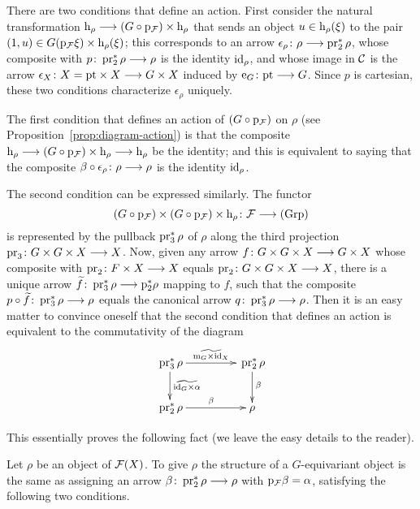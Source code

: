 \begin{3   FIBERED CATEGORIES}
\begin{3.8 Equivariant objects in fibcats}
There are two conditions that define an action. First consider the natural transformation $\h_{\rho} \arr (G \circ \p_{\cF}) \times \h_{\rho}$ that sends an object $u \in  \mathrm{h}_{\rho}(\xi)$ to the pair $(1, u) \in G(\mathrm{p}_{\mathcal{F}}\xi) \times \mathrm{h}_{\rho}(\xi)$; this corresponds to an arrow $\epsilon_{\rho} \colon \rho \arr \pr_{2}^{*}\rho$, whose composite with $p \colon  \pr_{2}^{*}\rho \arr \rho$ is the identity $\mathrm{id}_{\rho}$, and whose image in $\mathcal{C}$ is the arrow $\epsilon_{X}\colon X = \pt \times X \arr G \times X$ induced by $\iden_{G} \colon \pt \arr G$. Since $p$ is cartesian, these two conditions characterize $\epsilon_{\rho}$ uniquely.

The first condition that defines an action of $(G \circ \mathrm{p}_{\mathcal{F}})$ on $\rho$ (see Proposition~\ref{prop:diagram-action}) is that the composite $\h_{\rho} \arr (G \circ \p_{\cF}) \times \h_{\rho} \arr \h_{\rho}$ be the identity; and this is equivalent to saying that the composite $\beta \circ \epsilon_{\rho} \colon \rho \arr \rho$ is the identity $\mathrm{id}_{\rho}$.

The second condition can be expressed similarly. The functor
   \[
   (G \circ \p_{\cF}) \times (G \circ \p_{\cF}) \times \h_{\rho} \colon \cF 
   \arr \catgrp
   \]
is represented by the pullback $\operatorname{pr}_{3}^{*}\rho$ of $\rho$ along the third projection $\pr_{3} \colon G \times G \times X \arr X$. Now, given any arrow $f \colon G \times G \times X \arr G \times X$ whose composite with $\pr_{2}\colon F \times X \arr X$ equals $\pr_{2}\colon G \times G \times X \arr X$, there is a unique arrow $\widetilde{f} \colon \pr_{3}^{*}\rho \arr \p_{2}^{*}\rho$ mapping to $f$, such that the composite $p \circ \widetilde{f} \colon  \pr_{3}^{*}\rho \arr \rho$ equals the canonical arrow $q \colon \pr_{3}^{*}\rho \arr \rho$. Then it is an easy matter to convince oneself that the second condition that defines an action is equivalent to the commutativity of the diagram
   \begin{equation}\label{eq:lifts}
   \xymatrix@C+20pt{
   {}\pr_{3}^{*}\rho \ar[r]^{\widetilde{\mul_{G}\times \id_{X}}}
      \ar[d]^{\widetilde{\id_{G}\times \alpha}} &
   {}\pr_{2}^{*}\rho \ar[d]^{\beta}\\
   {}\pr_{2}^{*}\rho \ar[r]^{\beta}&
   {}\rho
   }
   \end{equation}

This essentially proves the following fact (we leave the easy details to the reader).

\begin{proposition}
Let $\rho$ be an object of $\mathcal{F}(X)$. To give $\rho$ the structure of a  $G$-equivariant object is the same as assigning an arrow $\beta \colon  \pr_{2}^{*}\rho \arr \rho$ with $\mathrm{p}_{\mathcal{F}}\beta = \alpha$, satisfying the following two conditions.
\begin{enumeratei}


\end{enumeratei}
\end{proposition}
\end{3.8 Equivariant objects in fibcats}
\end{3   FIBERED CATEGORIES}
